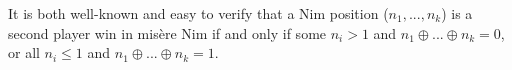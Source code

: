 It is both well-known and easy to verify that a Nim position ($n_{1}, ...,n_{k}$) is a second player win in misère Nim if and only if some $n_{i} > 1$ and $n_{1} \oplus ... \oplus n_{k}=0$, or all $n_{i}\le1$ and $n_{1} \oplus ... \oplus n_{k}=1$.

